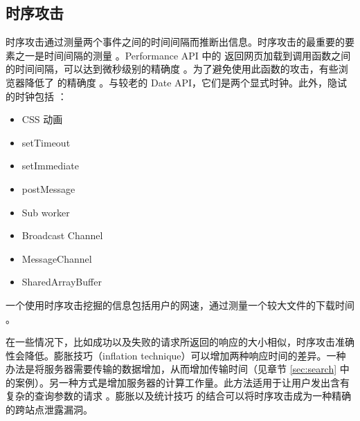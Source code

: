 \subsection{时序攻击}

时序攻击通过测量两个事件之间的时间间隔而推断出信息。时序攻击的最重要的要素之一是时间间隔的测量 \cite{clock}。Performance API 中的  返回网页加载到调用函数之间的时间间隔，可以达到微秒级别的精确度 \cite{m_now}。为了避免使用此函数的攻击，有些浏览器降低了 的精确度 \cite{p_chr,p_moz,p_web}。与较老的 Date API，它们是两个显式时钟。此外，隐试的时钟包括 \cite{timers}：

\begin{multicols}{2}
    \begin{itemize}
        \item CSS 动画
        \item setTimeout
        \item setImmediate
        \item postMessage
        \item Sub worker
        \item Broadcast Channel
        \item MessageChannel
        \item SharedArrayBuffer
    \end{itemize}
\end{multicols}

一个使用时序攻击挖掘的信息包括用户的网速，通过测量一个较大文件的下载时间 \cite{speed}。

在一些情况下，比如成功以及失败的请求所返回的响应的大小相似，时序攻击准确性会降低。膨胀技巧（inflation technique）可以增加两种响应时间的差异。一种办法是将服务器需要传输的数据增加，从而增加传输时间（见章节 \ref{sec:search} 中的案例）。另一种方式是增加服务器的计算工作量。此方法适用于让用户发出含有复杂的查询参数的请求 \cite{inflation}。膨胀以及统计技巧 \cite{stats} 的结合可以将时序攻击成为一种精确的跨站点泄露漏洞。